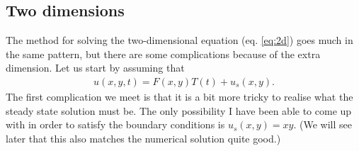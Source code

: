 \documentclass[12pt, a4paper]{article}
\begin{document}
\subsection{Two dimensions}

The method for solving the two-dimensional equation (eq. \ref{eq:2d}) goes much in the same pattern, but 
there are some complications because of the extra dimension. Let us start by assuming that 
\begin{align*}
u(x,y,t) = F(x,y)T(t) + u_s(x,y). 
\end{align*}
The first complication we meet is that it is a bit more tricky to realise what the steady state solution 
must be. The only possibility I have been able to come up with in order to satisfy the boundary 
conditions is $u_s(x,y) = xy$. (We will see later that this also matches the numerical solution quite 
good.)  
\end{document}

